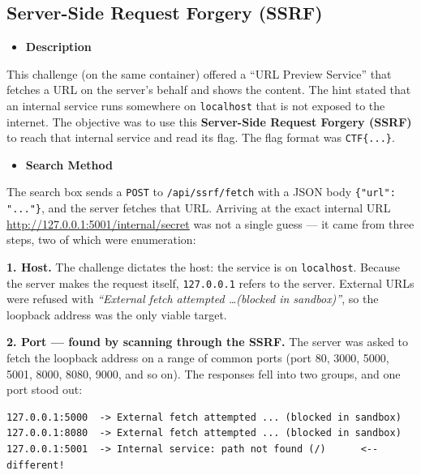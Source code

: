 \documentclass[11pt]{article}
\begin{document}
\subsection{Server-Side Request Forgery (SSRF)}

\begin{itemize}[leftmargin=1.5em]
    \item \textbf{Description}
\end{itemize}
\noindent This challenge (on the same container) offered a ``URL Preview Service'' that fetches a URL on the server's behalf and shows the content. The hint stated that an internal service runs somewhere on \texttt{localhost} that is not exposed to the internet. The objective was to use this \textbf{Server-Side Request Forgery (SSRF)} to reach that internal service and read its flag. The flag format was \texttt{CTF\{...\}}.

\begin{itemize}[leftmargin=1.5em]
    \item \textbf{Search Method}
\end{itemize}
\noindent The search box sends a \texttt{POST} to \texttt{/api/ssrf/fetch} with a JSON body \texttt{\{"url": "..."\}}, and the server fetches that URL. Arriving at the exact internal URL \url{http://127.0.0.1:5001/internal/secret} was not a single guess --- it came from three steps, two of which were enumeration:

\noindent \textbf{1. Host.} The challenge dictates the host: the service is on \texttt{localhost}. Because the server makes the request itself, \texttt{127.0.0.1} refers to the server. External URLs were refused with \emph{``External fetch attempted \ldots (blocked in sandbox)''}, so the loopback address was the only viable target.

\noindent \textbf{2. Port --- found by scanning through the SSRF.} The server was asked to fetch the loopback address on a range of common ports (port 80, 3000, 5000, 5001, 8000, 8080, 9000, and so on). The responses fell into two groups, and one port stood out:

\begin{footnotesize}
\begin{verbatim}
127.0.0.1:5000  -> External fetch attempted ... (blocked in sandbox)
127.0.0.1:8080  -> External fetch attempted ... (blocked in sandbox)
127.0.0.1:5001  -> Internal service: path not found (/)      <-- different!
\end{verbatim}
\end{footnotesize}
\end{document}
